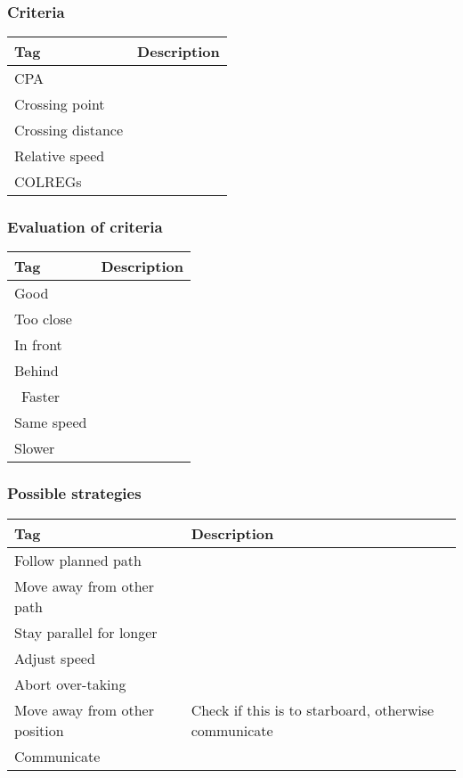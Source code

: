 \subsubsection{Criteria}
\begin{table}[h]
	\begin{tabular}{p{}|p{}}
		\toprule
		Tag & Description\\
		\midrule
		CPA & \\
		Crossing point & \\
		Crossing distance & \\
		Relative speed & \\
		COLREGs & \\
		\bottomrule
	\end{tabular}
	
	\label{tab:criteria}
\end{table}

\subsubsection{Evaluation of criteria}
\begin{table}[h]
	\begin{tabular}{p{}|p{}}
		\toprule
		Tag & Description\\
		\midrule
		Good & \\
		Too close & \\
		In front & \\
		Behind & \\\
		Faster & \\
		Same speed & \\
		Slower & \\
		\bottomrule
	\end{tabular}
	
	\label{tab:evaluations}
\end{table}

\subsubsection{Possible strategies}
\begin{table}[h]
	\begin{tabular}{p{}|p{}}
		\toprule
		Tag & Description\\
		\midrule
		Follow planned path & \\
		Move away from other path & \\
		Stay parallel for longer & \\
		Adjust speed & \\
		Abort over-taking & \\
		Move away from other position & Check if this is to starboard, otherwise communicate \\
		Communicate & \\
		\bottomrule
	\end{tabular}
	
	\label{tab:strategies}
\end{table}


